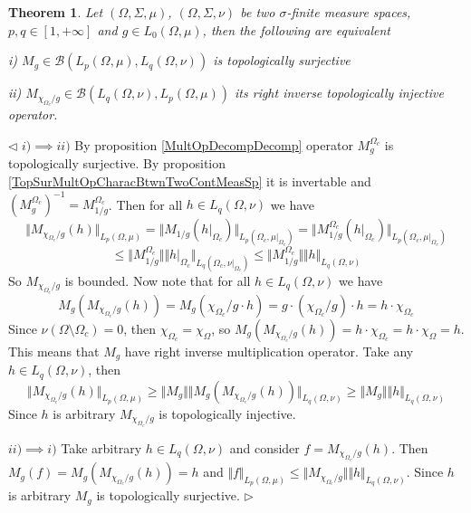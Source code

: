 \documentclass[12pt]{article}
\newtheorem{theorem}{Theorem}[subsection]
\newenvironment{proof}{\par $\triangleleft$}{$\triangleright$}
\begin{document}
\begin{theorem}\label{TopSurMultOpDescBtwnTwoMeasSp} Let $(\Omega,\Sigma,\mu)$, $(\Omega,\Sigma,\nu)$ be two $\sigma$-finite measure spaces, $p,q\in[1,+\infty]$ and $g\in L_0(\Omega,\mu)$, then the following are equivalent

i) $M_g\in\mathcal{B}(L_p(\Omega,\mu),L_q(\Omega,\nu))$ is topologically surjective

ii) $M_{\chi_{\Omega_c}/g}\in\mathcal{B}(L_q(\Omega,\nu), L_p(\Omega,\mu))$ its right inverse topologically injective operator.
\end{theorem}
\begin{proof}
$i)\implies ii)$ By proposition \ref{MultOpDecompDecomp} operator $M_g^{\Omega_c}$ is topologically surjective. By proposition \ref{TopSurMultOpCharacBtwnTwoContMeasSp} it is invertable and $(M_g^{\Omega_c})^{-1}=M_{1/g}^{\Omega_c}$. Then for all $h\in L_q(\Omega,\nu)$ we have
$$
\Vert M_{\chi_{\Omega_c}/g}(h)\Vert_{L_p(\Omega,\mu)}=
\Vert M_{1/g}(h|_{\Omega_c})\Vert_{L_p(\Omega_c,\mu|_{\Omega_c})}=
\Vert M_{1/g}^{\Omega_c}(h|_{\Omega_c})\Vert_{L_p(\Omega_c,\mu|_{\Omega_c})}
$$
$$
\leq\Vert M_{1/g}^{\Omega_c}\Vert\Vert h|_{\Omega_c}\Vert_{L_q(\Omega_c,\nu|_{\Omega_c})}
\leq\Vert M_{1/g}^{\Omega_c}\Vert\Vert h\Vert_{L_q(\Omega,\nu)}
$$
So $M_{\chi_{\Omega_c}/g}$ is bounded. Now note that for all $h\in L_q(\Omega,\nu)$ we have
$$
M_g(M_{\chi_{\Omega_c}/g}(h))
=M_g(\chi_{\Omega_c}/g\cdot h)
=g\cdot(\chi_{\Omega_c}/g)\cdot  h
=h\cdot\chi_{\Omega_c}
$$
Since $\nu(\Omega\setminus\Omega_c)=0$, then $\chi_{\Omega_c}=\chi_{\Omega}$, so $M_g(M_{\chi_{\Omega_c}/g}(h))=h\cdot\chi_{\Omega_c}=h\cdot\chi_{\Omega}=h$. This means that $M_g$ have right inverse multiplication operator. Take any $h\in L_q(\Omega,\nu)$, then
$$
\Vert M_{\chi_{\Omega_c}/g}(h)\Vert_{L_p(\Omega,\mu)}
\geq\Vert M_g\Vert\Vert M_g(M_{\chi_{\Omega_c}/g}(h))\Vert_{L_q(\Omega,\nu)}
\geq\Vert M_g\Vert\Vert h\Vert_{L_q(\Omega,\nu)}
$$
Since $h$ is arbitrary $M_{\chi_{\Omega_c}/g}$ is topologically injective.

$ii)\implies i)$ Take arbitrary $h\in L_q(\Omega,\nu)$ and consider $f=M_{\chi_{\Omega_c}/g}(h)$. Then $M_g(f)=M_g(M_{\chi_{\Omega_c}/g}(h))=h$ and $\Vert f\Vert_{L_p(\Omega,\mu)}\leq\Vert M_{\chi_{\Omega_c}/g}\Vert\Vert h\Vert_{L_q(\Omega,\nu)}$. Since $h$ is arbitrary $M_g$ is topologically surjective.
\end{proof}
\end{document}
